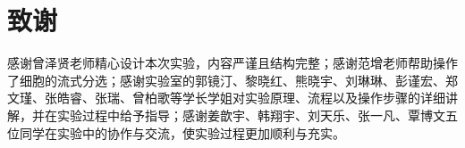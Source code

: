 \section{致谢}

感谢曾泽贤老师精心设计本次实验，内容严谨且结构完整；感谢范增老师帮助操作了细胞的流式分选；感谢实验室的郭镜汀、黎晓红、熊晓宇、刘琳琳、彭谨宏、郑文瑾、张皓睿、张瑞、曾柏歌等学长学姐对实验原理、流程以及操作步骤的详细讲解，并在实验过程中给予指导；感谢姜歆宇、韩翔宇、刘天乐、张一凡、覃博文五位同学在实验中的协作与交流，使实验过程更加顺利与充实。